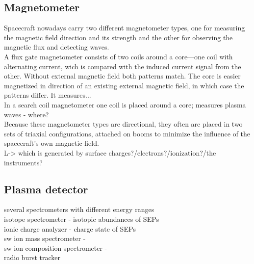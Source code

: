 \subsection{Magnetometer}

Spacecraft nowadays carry two different magnetometer types, one for measuring the magnetic field direction and its strength and the other for observing the magnetic flux and detecting waves.\\

A flux gate magnetometer consists of two coils around a core---one coil with alternating current, wich is compared with the induced current signal from the other. Without external magnetic field both patterns match. The core is easier magnetized in direction of an existing external magnetic field, in which case the patterns differ. It measures...\\
In a search coil magnetometer one coil is placed around a core; measures plasma waves - where?\\

Because these magnetometer types are directional, they often are placed in two sets of triaxial configurations, attached on booms to minimize the influence of the spacecraft's own magnetic field.\\
L-> which is generated by surface charges?/electrons?/ionization?/the instruments?\\


\subsection{Plasma detector}

several spectrometers with different energy ranges\\

isotope spectrometer - isotopic abundances of SEPs\\
ionic charge analyzer - charge state of SEPs\\
sw ion mass spectrometer - \\
sw ion composition spectrometer - \\
radio burst tracker\\



